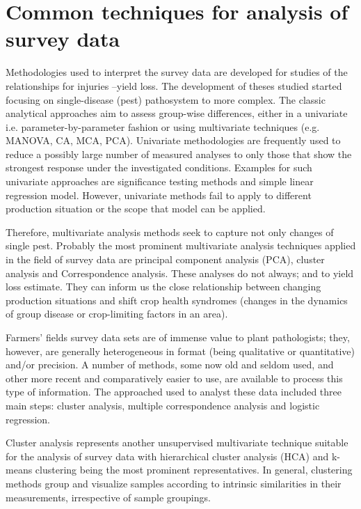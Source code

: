 \section*{Common techniques for analysis of survey data}

Methodologies used to interpret the survey data are developed for studies of the relationships for injuries --yield loss. The development of theses studied started focusing on single-disease (pest) pathosystem to more complex. The classic analytical approaches aim to assess group-wise differences, either in a univariate i.e. parameter-by-parameter fashion or using multivariate techniques (e.g. MANOVA, CA, MCA, PCA). Univariate methodologies are frequently used to reduce a possibly large number of measured analyses to only those that show the strongest response under the investigated conditions. Examples for such univariate approaches are significance testing methods and simple linear regression model. However, univariate methods fail to apply to different production situation or the scope that model can be applied.


Therefore, multivariate analysis methods seek to capture not only changes of single pest. Probably the most prominent multivariate analysis techniques applied in the field of survey data are principal component analysis (PCA), cluster analysis and Correspondence analysis. These analyses do not always; and to yield loss estimate. They can inform us the close relationship between changing production situations and shift crop health syndromes (changes in the dynamics of group disease or crop-limiting factors in an area). 

Farmers' fields survey data sets are of immense value to plant pathologists; they, however, are generally heterogeneous in format (being qualitative or quantitative) and/or precision. A number of methods, some now old and seldom used, and other more recent and comparatively easier to use, are available to process this type of information. The approached used to analyst these data included three main steps: cluster analysis, multiple correspondence analysis and logistic regression.

Cluster analysis represents another unsupervised multivariate technique suitable for the analysis of survey data with hierarchical cluster analysis (HCA) and k-means clustering  being the most prominent representatives. In general, clustering methods group and visualize samples according to intrinsic similarities in their measurements, irrespective of sample groupings. 

